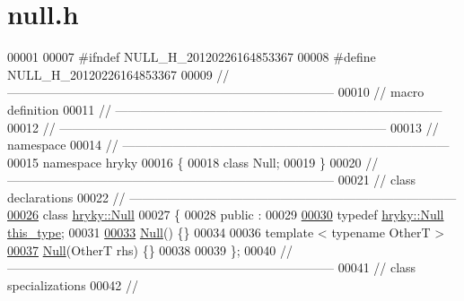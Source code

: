 \hypertarget{null_8h_source}{\section{null.\-h}
}

\begin{DoxyCode}
00001 
00007 \textcolor{preprocessor}{#ifndef NULL\_H\_20120226164853367}
00008 \textcolor{preprocessor}{}\textcolor{preprocessor}{#define NULL\_H\_20120226164853367}
00009 \textcolor{preprocessor}{}\textcolor{comment}{//
      ------------------------------------------------------------------------------}
00010 \textcolor{comment}{// macro definition}
00011 \textcolor{comment}{//
      ------------------------------------------------------------------------------}
00012 \textcolor{comment}{//
      ------------------------------------------------------------------------------}
00013 \textcolor{comment}{// namespace}
00014 \textcolor{comment}{//
      ------------------------------------------------------------------------------}
00015 \textcolor{keyword}{namespace }hryky
00016 \{
00018     \textcolor{keyword}{class }Null;
00019 \}
00020 \textcolor{comment}{//
      ------------------------------------------------------------------------------}
00021 \textcolor{comment}{// class declarations}
00022 \textcolor{comment}{//
      ------------------------------------------------------------------------------}
\hypertarget{null_8h_source_l00026}{}\hyperlink{classhryky_1_1_null}{00026} \textcolor{comment}{}\textcolor{keyword}{class }\hyperlink{classhryky_1_1_null}{hryky::Null}
00027 \{
00028 \textcolor{keyword}{public} :
00029 
\hypertarget{null_8h_source_l00030}{}\hyperlink{classhryky_1_1_null_a07f3ec268976dc8a2eaa66e61861c282}{00030}     \textcolor{keyword}{typedef} \hyperlink{classhryky_1_1_null}{hryky::Null} \hyperlink{classhryky_1_1_null_a07f3ec268976dc8a2eaa66e61861c282}{this_type};
00031 
\hypertarget{null_8h_source_l00033}{}\hyperlink{classhryky_1_1_null_a6c119aabf95e6cf5dfec276693a6653d}{00033}     \hyperlink{classhryky_1_1_null_a6c119aabf95e6cf5dfec276693a6653d}{Null}() \{\}
00034 
00036     \textcolor{keyword}{template} < \textcolor{keyword}{typename} OtherT >
\hypertarget{null_8h_source_l00037}{}\hyperlink{classhryky_1_1_null_a7dff7853c19d89bb009bd2849640fde6}{00037}     \hyperlink{classhryky_1_1_null_a7dff7853c19d89bb009bd2849640fde6}{Null}(OtherT rhs) \{\}
00038 
00039 \};
00040 \textcolor{comment}{//
      ------------------------------------------------------------------------------}
00041 \textcolor{comment}{// class specializations}
00042 \textcolor{comment}{//
}
\end{DoxyCode}
